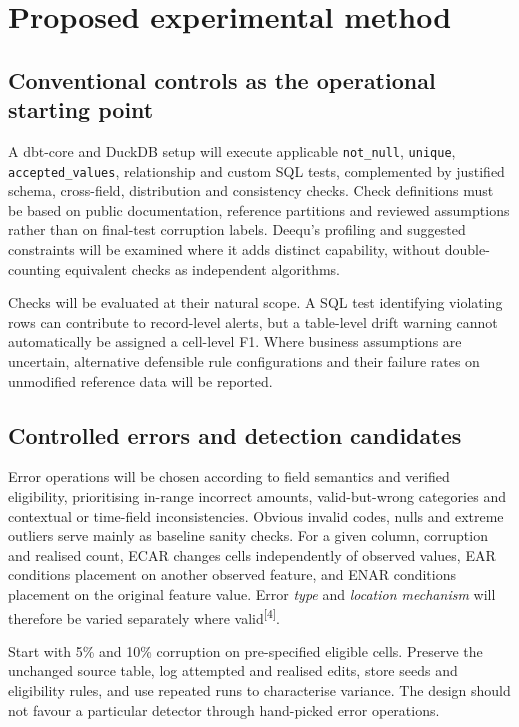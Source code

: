\documentclass[10pt,a4paper]{article}
\newcommand{\rf}[1]{\textsuperscript{[#1]}}
\begin{document}
\section{Proposed experimental method}
\subsection{Conventional controls as the operational starting point}
A dbt-core and DuckDB setup will execute applicable \texttt{not\_null}, \texttt{unique}, \texttt{accepted\_values}, relationship and custom SQL tests, complemented by justified schema, cross-field, distribution and consistency checks. Check definitions must be based on public documentation, reference partitions and reviewed assumptions rather than on final-test corruption labels. Deequ's profiling and suggested constraints will be examined where it adds distinct capability, without double-counting equivalent checks as independent algorithms.

Checks will be evaluated at their natural scope. A SQL test identifying violating rows can contribute to record-level alerts, but a table-level drift warning cannot automatically be assigned a cell-level F1. Where business assumptions are uncertain, alternative defensible rule configurations and their failure rates on unmodified reference data will be reported.

\subsection{Controlled errors and detection candidates}
Error operations will be chosen according to field semantics and verified eligibility, prioritising in-range incorrect amounts, valid-but-wrong categories and contextual or time-field inconsistencies. Obvious invalid codes, nulls and extreme outliers serve mainly as baseline sanity checks. For a given column, corruption and realised count, ECAR changes cells independently of observed values, EAR conditions placement on another observed feature, and ENAR conditions placement on the original feature value. Error \emph{type} and \emph{location mechanism} will therefore be varied separately where valid\rf{4}.

Start with 5\% and 10\% corruption on pre-specified eligible cells. Preserve the unchanged source table, log attempted and realised edits, store seeds and eligibility rules, and use repeated runs to characterise variance. The design should not favour a particular detector through hand-picked error operations.
\end{document}
